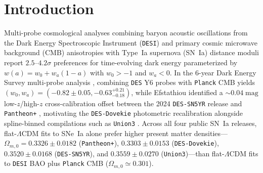\documentclass[11pt,a4paper]{article}
\begin{document}
\begin{abstract}
\texttt{DESI} DR1 void catalogs (\texttt{DESIVAST} $0.08 \le z \le 0.23$, $N = 68$: $-0.047 \pm 0.050\;\mathrm{mag}$; \texttt{ASTRA-DESI} BGS+LRG effective-radius spheres $0.10 \le z \le 0.95$, $N = 734$: $-0.035 \pm 0.034\;\mathrm{mag}$, $95\%$ GLS interval $[-0.102, +0.032]\;\mathrm{mag}$; strict LRG-only $0.42 \le z \le 0.95$, $N = 128$: $+0.016 \pm 0.046\;\mathrm{mag}$) yields null-consistent slopes across all redshift regimes. Under conditional $N^{-1/2}$ scaling assuming identical per-SN sensitivity and a fixed hypothetical $-0.052\;\mathrm{mag}$ directional amplitude, a $3\sigma$ test corresponds to an order-of-magnitude sample of $N_{\mathrm{SN}} \sim 2.8 \times 10^3$ SNe within the \texttt{DESI} footprint.

\smallskip\noindent\textbf{Keywords:} dark energy theory, cosmological parameters from LSS, supernova type Ia - standard candles, cosmic web
\end{abstract}

\section{Introduction}
Multi-probe cosmological analyses combining baryon acoustic oscillations from the Dark Energy Spectroscopic Instrument (\texttt{DESI}) \cite{DESI2024VI,DESIDR2_2025} and primary cosmic microwave background (CMB) anisotropies \cite{Planck2018VI} with Type~Ia supernova (SN~Ia) distance moduli report $2.5\text{--}4.2\sigma$ preferences for time-evolving dark energy parameterized by $w(a) = w_0 + w_a(1 - a)$ with $w_0 > -1$ and $w_a < 0$. In the 6-year Dark Energy Survey multi-probe analysis \cite{DES2026DynDE}, combining \texttt{DES} Y6 probes with \texttt{Planck} CMB yields $(w_0, w_a) = (-0.82 \pm 0.05, -0.63^{+0.21}_{-0.18})$, while Efstathiou \cite{Efstathiou2025SN} identified a $\sim 0.04\;\mathrm{mag}$ low-$z$/high-$z$ cross-calibration offset between the 2024 \texttt{DES-SN5YR} release \cite{DESSN5YR2024} and \texttt{Pantheon+} \cite{Brout2022}, motivating the \texttt{DES-Dovekie} photometric recalibration \cite{PopovicDovekie2025} alongside spline-binned compilations such as \texttt{Union3} \cite{RubinUnion3_2025}. Across all four public SN~Ia releases, flat-$\Lambda$CDM fits to SNe~Ia alone prefer higher present matter densities---$\Omega_{m,0} = 0.3326 \pm 0.0182$ (\texttt{Pantheon+}), $0.3303 \pm 0.0153$ (\texttt{DES-Dovekie}), $0.3520 \pm 0.0168$ (\texttt{DES-SN5YR}), and $0.3559 \pm 0.0270$ (\texttt{Union3})---than flat-$\Lambda$CDM fits to \texttt{DESI} BAO plus \texttt{Planck} CMB ($\Omega_{m,0} \simeq 0.301$).
\end{document}
